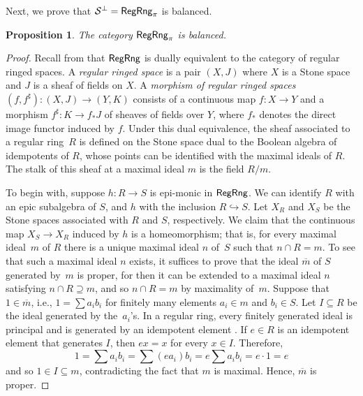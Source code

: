 \documentclass[a4paper,10pt,reqno]{amsart}
\newtheorem{proposition}[theorem]{Proposition}
\theoremstyle{definition}
\theoremstyle{remark}
\newcommand{\RegRng}{{\sf RegRng}}						%
\newcommand{\ar}[1]{\mathcal{#1}}							%
\newcommand{\into}{\hookrightarrow}						%
\newcommand{\ort}[1]{{#1}^{\perp}}						%
\begin{document}
Next, we prove that $\ort{\ar{S}}=\RegRng_{\pi}$ is balanced.

\begin{proposition}
The category $\RegRng_{\pi}$ is balanced.
\end{proposition}
%
\begin{proof}
Recall from \cite[Theorem~10.3]{Pierce1967} that $\RegRng$ is dually equivalent to the category of regular ringed spaces. A \emph{regular ringed space} is a pair $(X, J)$ where $X$ is a Stone space and $J$ is a sheaf of fields on $X$. A \emph{morphism of regular ringed spaces} $(f,f^{\sharp})\colon (X,J)\to (Y,K)$ consists of a continuous map $f\colon X\to Y$ and a morphism $f^{\sharp}\colon K\to f_{*}J$ of sheaves of fields over $Y$, where $f_{*}$ denotes the direct image functor induced by $f$. Under this dual equivalence, the sheaf associated to a regular ring~$R$ is defined on the Stone space dual to the Boolean algebra of idempotents of $R$, whose points can be identified with the maximal ideals of $R$. The stalk of this sheaf at a maximal ideal $m$ is the field $R/m$.

To begin with, suppose $h\colon R\to S$ is epi-monic in $\RegRng$. We can identify $R$ with an epic subalgebra of $S$, and $h$ with the inclusion $R\into S$. Let $X_{R}$ and $X_{S}$ be the Stone spaces associated with $R$ and $S$, respectively. We claim that the continuous map $X_{S}\to X_{R}$ induced by $h$ is a homeomorphism; that is, for every maximal ideal~$m$ of $R$ there is a unique maximal ideal $n$ of~$S$ such that $n\cap R = m$. 
%
To see that such a maximal ideal $n$ exists, it suffices to prove that the ideal $\overline{m}$ of $S$ generated by~$m$ is proper, for then it can be extended to a maximal ideal $n$ satisfying $n\cap R \supseteq m$, and so $n\cap R = m$ by maximality of~$m$. Suppose that $1\in \overline{m}$, i.e., $1=\sum{a_{i}b_{i}}$ for finitely many elements $a_{i}\in m$ and $b_{i}\in S$. Let $I\subseteq R$ be the ideal generated by the~$a_{i}$'s. In a regular ring, every finitely generated ideal is principal and is generated by an idempotent element \cite[Theorem~1.1]{Goodearl1991}. If $e\in R$ is an idempotent element that generates $I$, then $ex=x$ for every $x\in I$. Therefore,
\[
1 =\textstyle\sum{a_{i}b_{i}} = \sum{(ea_{i})b_{i}} = e \sum{a_{i}b_{i}} = e\cdot 1 = e
\]
and so $1\in I \subseteq m$, contradicting the fact that $m$ is maximal. Hence, $\overline{m}$ is proper. 


\end{proof}
\end{document}
